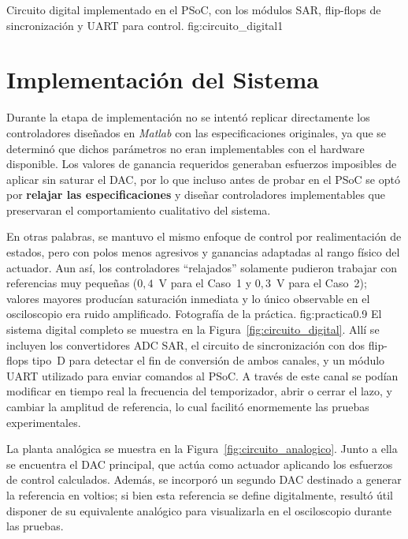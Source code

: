 
{Circuito digital implementado en el PSoC, con los módulos SAR, flip-flops de sincronización y UART para control.}
{fig:circuito_digital}{1}
\section{Implementación del Sistema}

Durante la etapa de implementación no se intentó replicar directamente los controladores diseñados en \textit{Matlab} con las especificaciones originales, 
ya que se determinó que dichos parámetros no eran implementables con el hardware disponible. 
Los valores de ganancia requeridos generaban esfuerzos imposibles de aplicar sin saturar el DAC, 
por lo que incluso antes de probar en el PSoC se optó por \textbf{relajar las especificaciones} 
y diseñar controladores implementables que preservaran el comportamiento cualitativo del sistema.

En otras palabras, se mantuvo el mismo enfoque de control por realimentación de estados, 
pero con polos menos agresivos y ganancias adaptadas al rango físico del actuador. 
Aun así, los controladores “relajados” solamente pudieron trabajar con referencias muy pequeñas 
($0{,}4$~V para el Caso~1 y $0{,}3$~V para el Caso~2); 
valores mayores producían saturación inmediata y lo único observable en el osciloscopio era ruido amplificado.
{Fotografía de la práctica.}
{fig:practica}{0.9}
El sistema digital completo se muestra en la Figura~\ref{fig:circuito_digital}. 
Allí se incluyen los convertidores \textsc{ADC SAR}, 
el circuito de sincronización con dos flip-flops tipo~D para detectar el fin de conversión de ambos canales, 
y un módulo \textsc{UART} utilizado para enviar comandos al PSoC. 
A través de este canal se podían modificar en tiempo real la frecuencia del temporizador, 
abrir o cerrar el lazo, y cambiar la amplitud de referencia, 
lo cual facilitó enormemente las pruebas experimentales.




La planta analógica se muestra en la Figura~\ref{fig:circuito_analogico}. 
Junto a ella se encuentra el DAC principal, que actúa como actuador aplicando los esfuerzos de control calculados. 
Además, se incorporó un segundo DAC destinado a generar la referencia en voltios; 
si bien esta referencia se define digitalmente, resultó útil disponer de su equivalente analógico para visualizarla en el osciloscopio durante las pruebas.



